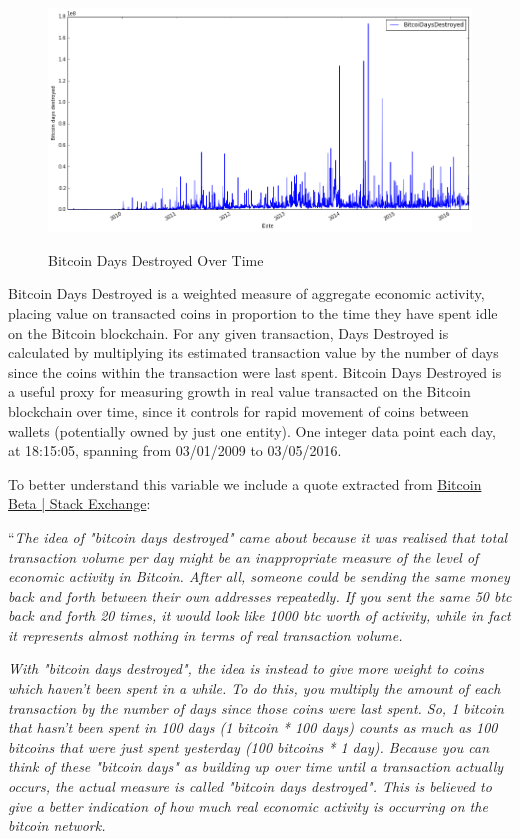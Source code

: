 \begin{figure}[bth]
  \myfloatalign
  {\includegraphics[width=1\linewidth]
    {gfx/bitcoin-days-destroyed-over-time}}
  \caption{Bitcoin Days Destroyed Over Time}
  \label{fig:bitcoin-days-destroyed-over-time}
\end{figure}

Bitcoin Days Destroyed is a weighted measure of aggregate economic
activity, placing value on transacted coins in proportion to the time
they have spent idle on the Bitcoin blockchain. For any given
transaction, Days Destroyed is calculated by multiplying its estimated
transaction value by the number of days since the coins within the
transaction were last spent. Bitcoin Days Destroyed is a useful proxy
for measuring growth in real value transacted on the Bitcoin
blockchain over time, since it controls for rapid movement of coins
between wallets (potentially owned by just one entity). One integer
data point each day, at 18:15:05, spanning from 03/01/2009 to
03/05/2016.

To better understand this variable we include a quote extracted from
\href{http://bitcoin.stackexchange.com/questions/845/what-are-bitcoin-days-destroyed}{Bitcoin
  Beta | Stack Exchange}:

``\textit{The idea of "bitcoin days destroyed" came about because it
  was realised that total transaction volume per day might be an
  inappropriate measure of the level of economic activity in Bitcoin.
  After all, someone could be sending the same money back and forth
  between their own addresses repeatedly. If you sent the same 50 btc
  back and forth 20 times, it would look like 1000 btc worth of
  activity, while in fact it represents almost nothing in terms of
  real transaction volume.}

\textit{With "bitcoin days destroyed", the idea is instead to give
  more weight to coins which haven't been spent in a while. To do
  this, you multiply the amount of each transaction by the number of
  days since those coins were last spent. So, 1 bitcoin that hasn't
  been spent in 100 days (1 bitcoin * 100 days) counts as much as 100
  bitcoins that were just spent yesterday (100 bitcoins * 1 day).
  Because you can think of these "bitcoin days" as building up over
  time until a transaction actually occurs, the actual measure is
  called "bitcoin days destroyed". This is believed to give a better
  indication of how much real economic activity is occurring on the
  bitcoin network.}

